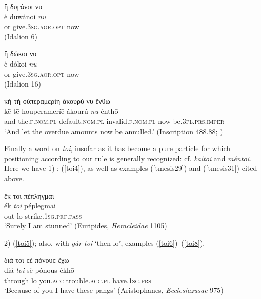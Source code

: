 \begin{exe}
\ex ἢ δυϝάνοι νυ\\
\gll ḕ duwánoi \emph{nu}\\
or give.\textsc{3sg.aor.opt} now\\
\trans (Idalion 6)
\label{nun19}
\end{exe}

\begin{exe}
\ex ἢ δώκοι νυ\\
\gll ḕ dṓkoi \emph{nu}\\
or give.\textsc{3sg.aor.opt} now\\
\trans (Idalion 16)
\label{nun20}
\end{exe}

\begin{exe}
\ex κὴ τὴ οὑπεραμερίη ἄκουρύ νυ ἔνθω\\
\gll kḕ tḕ houperameríē ákourú \emph{nu} énthō\\
and the.\textsc{f.nom.pl} default.\textsc{nom.pl} invalid.\textsc{f.nom.pl} now be.\textsc{3pl.prs.imper}\\
\trans `And let the overdue amounts now be annulled.' (Inscription 488.88; \citealp[183]{Meister1884})
\label{nun21}
\end{exe}

Finally a word on \textit{toi}, insofar as it has become a pure particle for which positioning according to our rule is generally recognized: cf. \textit{kaítoi} and \textit{méntoi}. Here we have 1) : (\ref{toi4}), as well as examples (\ref{tmesis29}) and (\ref{tmesis31}) cited above. 

\begin{exe}
\ex ἔκ τοι πέπληγμαι\\
\gll ék \emph{toi} péplēgmai\\
out lo strike.\textsc{1sg.prf.pass}\\
\trans `Surely I am stunned' (Euripides, \textit{Heracleidae} 1105)
\label{toi4}
\end{exe}

2) (\ref{toi5}); also, with \textit{gár toí} `then lo', examples (\ref{toi6})--(\ref{toi8}).

\begin{exe}
\ex διά τοι ϲὲ πόνουϲ ἔχω\\
\gll diá \emph{toi} sè pónous ékhō\\
through lo you.\textsc{acc} trouble.\textsc{acc.pl} have.\textsc{1sg.prs}\\
\trans `Because of you I have these pangs' (Aristophanes, \textit{Ecclesiazusae} 975)
\label{toi5}
\end{exe}

